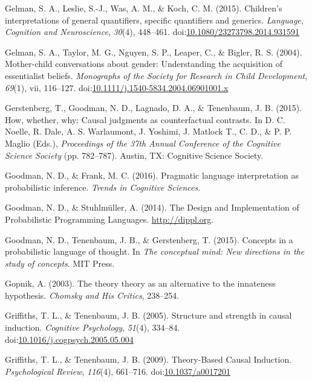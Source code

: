 \documentclass[english,floatsintext,man]{apa6}
\theoremstyle{definition}
\theoremstyle{definition}
\theoremstyle{definition}
\theoremstyle{remark}
\begin{document}
\hypertarget{ref-Gelman2015}{}
Gelman, S. A., Leslie, S.-J., Was, A. M., \& Koch, C. M. (2015).
Children's interpretations of general quantifiers, specific quantifiers
and generics. \emph{Language, Cognition and Neuroscience}, \emph{30}(4),
448--461.
doi:\href{https://doi.org/10.1080/23273798.2014.931591}{10.1080/23273798.2014.931591}

\hypertarget{ref-GelmanEtAl2004}{}
Gelman, S. A., Taylor, M. G., Nguyen, S. P., Leaper, C., \& Bigler, R.
S. (2004). Mother-child conversations about gender: Understanding the
acquisition of essentialist beliefs. \emph{Monographs of the Society for
Research in Child Development}, \emph{69}(1), vii, 116--127.
doi:\href{https://doi.org/10.1111/j.1540-5834.2004.06901001.x}{10.1111/j.1540-5834.2004.06901001.x}

\hypertarget{ref-Gerstenberg2015how}{}
Gerstenberg, T., Goodman, N. D., Lagnado, D. A., \& Tenenbaum, J. B.
(2015). How, whether, why: Causal judgments as counterfactual contrasts.
In D. C. Noelle, R. Dale, A. S. Warlaumont, J. Yoshimi, J. Matlock T.,
C. D., \& P. P. Maglio (Eds.), \emph{Proceedings of the 37th Annual
Conference of the Cognitive Science Society} (pp. 782--787). Austin, TX:
Cognitive Science Society.

\hypertarget{ref-Goodman2016}{}
Goodman, N. D., \& Frank, M. C. (2016). Pragmatic language
interpretation as probabilistic inference. \emph{Trends in Cognitive
Sciences}.

\hypertarget{ref-dippl}{}
Goodman, N. D., \& Stuhlmüller, A. (2014). The Design and Implementation
of Probabilistic Programming Languages. \url{http://dippl.org}.

\hypertarget{ref-Goodmanconcepts}{}
Goodman, N. D., Tenenbaum, J. B., \& Gerstenberg, T. (2015). Concepts in
a probabilistic language of thought. In \emph{The conceptual mind: New
directions in the study of concepts}. MIT Press.

\hypertarget{ref-Gopnik2003theory}{}
Gopnik, A. (2003). The theory theory as an alternative to the innateness
hypothesis. \emph{Chomsky and His Critics}, 238--254.

\hypertarget{ref-Griffiths2005}{}
Griffiths, T. L., \& Tenenbaum, J. B. (2005). Structure and strength in
causal induction. \emph{Cognitive Psychology}, \emph{51}(4), 334--84.
doi:\href{https://doi.org/10.1016/j.cogpsych.2005.05.004}{10.1016/j.cogpsych.2005.05.004}

\hypertarget{ref-Griffiths2009}{}
Griffiths, T. L., \& Tenenbaum, J. B. (2009). Theory-Based Causal
Induction. \emph{Psychological Review}, \emph{116}(4), 661--716.
doi:\href{https://doi.org/10.1037/a0017201}{10.1037/a0017201}
\end{document}
